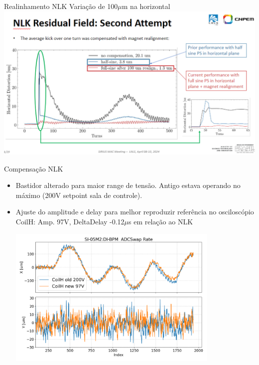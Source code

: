 \documentclass[1611]{beamer}					  %
\begin{document}
\begin{frame}{Realinhamento NLK}
Variação de 100$\mu$m na horizontal
\centering
\includegraphics[scale=0.6]{2024-04-19/figures/nlk_perturb.PNG}
    
\end{frame}

\begin{frame}{Compensação NLK}
\begin{itemize}
    \item Bastidor alterado para maior range de tensão. Antigo estava operando no máximo (200V setpoint sala de controle).
    \item Ajuste do amplitude e delay para melhor reproduzir referência no osciloscópio \\
    CoilH: Amp. 97V, DeltaDelay -0.12$\mu$s em relação ao NLK

    \centering
    \includegraphics[width=0.8\textwidth]{2024-04-19/figures/coilh_old_new.png}
\end{itemize}
\end{frame}
\end{document}
